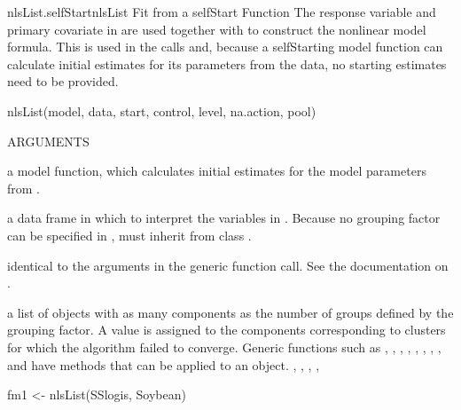 \documentclass[pdftex]{article} \usepackage{url,graphicx}
\begin{document}
\begin{Helpfile}{nlsList.selfStart}{nlsList Fit from a selfStart Function}
The response variable and primary covariate in 
are used together with  to construct the nonlinear model
formula. This is used in the  calls and, because a
selfStarting model function can calculate initial estimates for its
parameters from the data, no starting estimates need to be provided.
\begin{Example}
nlsList(model, data, start, control, level, na.action, pool)
\end{Example}
\begin{Argument}{ARGUMENTS}
\item[\Co{model:}]
a  model function, which calculates
initial estimates for the model parameters from .
\item[\Co{data:}]
a data frame in which to interpret the variables in
. Because no grouping factor can be specified in
,  must inherit from class
. 
\item[\Co{other arguments:}]
identical to the arguments in the generic
function call. See the documentation on .
\end{Argument}
a list of  objects with as many components as the number of
groups defined by the grouping factor. A  value is assigned
to the components corresponding to clusters for which the 
algorithm failed to converge. Generic functions such as ,
, , , ,
, , , and
 have methods that can be applied to an 
object.
, , ,
, 
\need 15pt
\vspace{-16pt}
\begin{Example}
fm1 <- nlsList(SSlogis, Soybean)
\end{Example}
\end{Helpfile}
\end{document}
